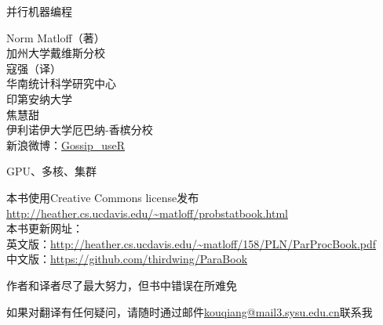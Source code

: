 \pagecolor{yellow}
\color{black}

\bigskip
\vspace{0.5in}
\bigskip
\begin{center}
{\Huge 并行机器编程}

{\LARGE Norm Matloff（著）\\
加州大学戴维斯分校\\
\bigskip
寇强（译）\\
\vspace{1 mm}
华南统计科学研究中心\\
\vspace{1 mm}
印第安纳大学\\
\vspace{3 mm}
焦慧甜\\
\vspace{1 mm}
伊利诺伊大学厄巴纳-香槟分校\\
\vspace{1 mm}
新浪微博：\href{http://www.weibo.com/thirdwing}{Gossip\_useR}
}





\bigskip

\vspace{0.5in}

{\LARGE GPU、多核、集群}
\end{center}
\vspace{1in}



\vspace{1.5in}
\noindent 本书使用Creative Commons license发布\\
\url{http://heather.cs.ucdavis.edu/~matloff/probstatbook.html}\\
\medskip
\noindent 本书更新网址：\\
英文版：\url{http://heather.cs.ucdavis.edu/~matloff/158/PLN/ParProcBook.pdf}\\
中文版：\url{https://github.com/thirdwing/ParaBook}

\medskip
\noindent 作者和译者尽了最大努力，但书中错误在所难免

\noindent 如果对翻译有任何疑问，请随时通过邮件\href{mailto:kouqiang@mail3.sysu.edu.cn}{kouqiang@mail3.sysu.edu.cn}联系我
\newpage

